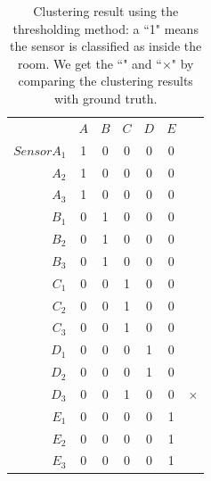 \begin{table}[h!]\footnotesize
 \begin{center}
	\begin{tabular}{ r|c|c|c|c|c|c }
	\multicolumn{1}{r}{}
	 &  \multicolumn{1}{c}{$A$}
	 & \multicolumn{1}{c}{$B$}
	 & \multicolumn{1}{c}{$C$}
	 & \multicolumn{1}{c}{$D$}
	  & \multicolumn{1}{c}{$E$} \\
	\cline{2-6} 
	$SensorA_{1}$ & 1 & 0 & 0 & 0 & 0 & \checkmark\\
	\cline{2-6}
	$A_{2}$ & 1 & 0 & 0 & 0 & 0 & \checkmark\\
	\cline{2-6}
	$A_{3}$ & 1 & 0 & 0 & 0 & 0 & \checkmark\\
	\cline{2-6}
	$B_{1}$ & 0 & 1 & 0 & 0 & 0 & \checkmark\\
	\cline{2-6}
	$B_{2}$ & 0 & 1 & 0 & 0 & 0 & \checkmark\\
	\cline{2-6}
	$B_{3}$ & 0 & 1 & 0 & 0 & 0 & \checkmark\\
	\cline{2-6}
	$C_{1}$ & 0 & 0 & 1 & 0 & 0 & \checkmark\\
	\cline{2-6}
	$C_{2}$ & 0 & 0 & 1 & 0 & 0 & \checkmark\\
	\cline{2-6}
	$C_{3}$ & 0 & 0 & 1 & 0 & 0 & \checkmark\\
	\cline{2-6}
	$D_{1}$ & 0 & 0 & 0 & 1 & 0 & \checkmark\\
	\cline{2-6}
	$D_{2}$ & 0 & 0 & 0 & 1 & 0 & \checkmark\\
	\cline{2-6}
	$D_{3}$ & 0 & 0 & 1 & 0 & 0 & $\times$\\
	\cline{2-6}
	$E_{1}$ & 0 & 0 & 0 & 0 & 1 & \checkmark\\
	\cline{2-6}
	$E_{2}$ & 0 & 0 & 0 & 0 & 1 & \checkmark\\
	\cline{2-6}
	$E_{3}$ & 0 & 0 & 0 & 0 & 1 & \checkmark\\
	\cline{2-6}
	\end{tabular}
 \end{center}
 \caption{Clustering result using the thresholding method: a ``1" means the sensor is classified as inside the room. We get the ``\checkmark" and ``$\times$" by comparing the clustering results with ground truth.}
 \label{tab:cluster}
\end{table}

